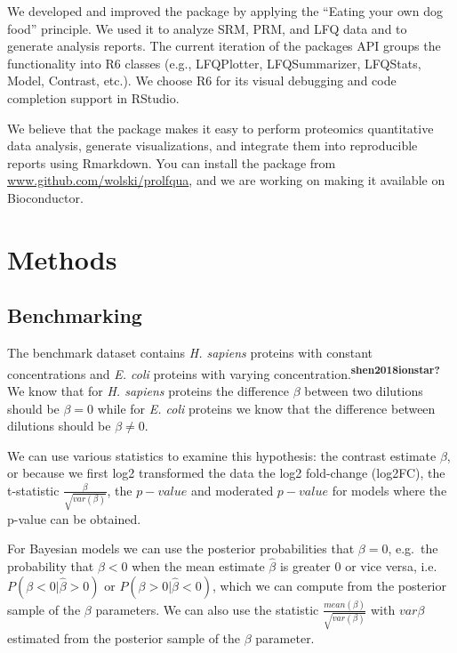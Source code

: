 \documentclass[journal=jacsat,manuscript=article]{achemso}
\begin{document}
We developed and improved the package by applying the ``Eating your own
dog food'' principle. We used it to analyze SRM, PRM, and LFQ data and
to generate analysis reports. The current iteration of the packages API
groups the functionality into R6 classes (e.g., LFQPlotter,
LFQSummarizer, LFQStats, Model, Contrast, etc.). We choose R6 for its
visual debugging and code completion support in RStudio.

We believe that the package makes it easy to perform proteomics
quantitative data analysis, generate visualizations, and integrate them
into reproducible reports using Rmarkdown. You can install the package
from \url{www.github.com/wolski/prolfqua}, and we are working on making
it available on Bioconductor.

\hypertarget{methods}{%
\section{Methods}\label{methods}}

\hypertarget{benchmarking}{%
\subsection{Benchmarking}\label{benchmarking}}

The benchmark dataset contains \emph{H. sapiens} proteins with constant
concentrations and \emph{E. coli} proteins with varying
concentration.\textsuperscript{\textbf{shen2018ionstar?}} We know that
for \emph{H. sapiens} proteins the difference \(\beta\) between two
dilutions should be \(\beta = 0\) while for \emph{E. coli} proteins we
know that the difference between dilutions should be \(\beta \ne 0\).

We can use various statistics to examine this hypothesis: the contrast
estimate \(\beta\), or because we first log2 transformed the data the
log2 fold-change (log2FC), the t-statistic
\(\frac{\beta}{\sqrt{var(\beta)}}\), the \(p-value\) and moderated
\(p-value\) for models where the p-value can be obtained.

For Bayesian models we can use the posterior probabilities that
\(\beta=0\), e.g.~the probability that \(\beta < 0\) when the mean
estimate \(\hat{\beta}\) is greater \(0\) or vice versa,
i.e.~\(P(\beta < 0| \hat{\beta} > 0)\) or
\(P(\beta > 0 | \hat{\beta} < 0)\), which we can compute from the
posterior sample of the \(\beta\) parameters. We can also use the
statistic \(\frac{mean(\beta)}{\sqrt{var(\beta)}}\) with \(var{\beta}\)
estimated from the posterior sample of the \(\beta\) parameter.
\end{document}
